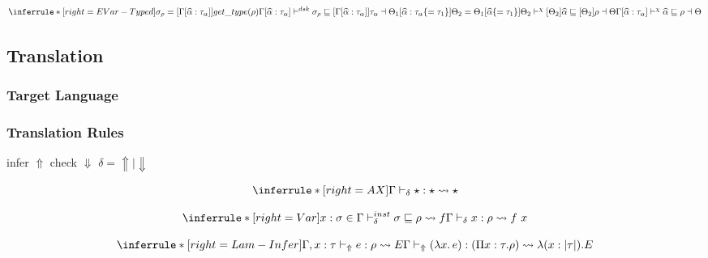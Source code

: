 
\[
\inferrule*[right=EVar-Typed]
{
\sigma_\rho = [\Gamma [\widehat \alpha:\tau_\alpha] ] get\_type(\rho)\\
\Gamma[\widehat \alpha:\tau_\alpha] \dsk \sigma_\rho \sqsubseteq [ \Gamma[\widehat \alpha:\tau_\alpha] ]\tau_\alpha \dashv \Theta_1[\widehat \alpha:\tau_\alpha\{=\tau_1\}] \\
\Theta_2 = \Theta_1[\widehat \alpha\{=\tau_1\}] \\
\Theta_2 \dskunify [\Theta_2]\widehat \alpha \sqsubseteq [\Theta_2]\rho \dashv \Theta
}
{\Gamma[\widehat \alpha:\tau_\alpha] \dskunify \widehat \alpha \sqsubseteq \rho \dashv \Theta }
\]

\clearpage


\iffalse
\subsection{Translation}

\newcommand{\transto}[1]{\leadsto#1}
\newcommand{\translated}[1]{|#1|}
\newcommand{\cyancolorbox}[1]{\colorbox{cyan!30}{$#1$}}
\newcommand{\invariant}[2]{}

\subsubsection{Target Language}

\gram{\ottE\ottinterrule}

\subsubsection{Translation Rules}

\framebox{$ \infercheck e : \rho \invariant{E}{|\rho|}$ } infer $\Uparrow$ check $\Downarrow$ $\delta = \Uparrow \mid \Downarrow$

\[
\inferrule*[right=AX]
{} {\infercheck \star : \star \transto{\star}}
\]

\[
\inferrule*[right=Var]
{x:\sigma \in \Gamma \\ \instinfercheck \sigma \sqsubseteq \rho \transto{f} } {\infercheck x : \rho \transto{f\ x}}
\]

\[
\inferrule*[right=Lam-Infer]
{\Gamma,x: \tau \infertypeno e : \rho \transto{E} }
{\infertype (\lambda x.\, e) : (\Pi x: \tau. \rho) \transto {\lambda(x:\translated{\tau}). E}}
\]


